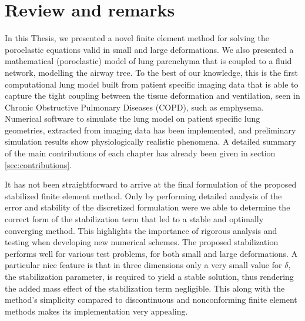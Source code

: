 

\section{Review and remarks}
In this Thesis, we presented a novel finite element method for solving the poroelastic equations valid in small and large deformations. We also presented a mathematical (poroelastic) model of lung parenchyma that is coupled to a fluid network, modelling the airway tree. 
To the best of our knowledge, this is the first computational lung model built from patient specific imaging data that is able to capture the tight coupling between the tissue deformation and ventilation, seen in Chronic Obstructive Pulmonary Diseases (COPD), such as emphysema. Numerical software to simulate the lung model on patient specific lung geometries, extracted from imaging data has been implemented, and preliminary simulation results show physiologically realistic phenomena. A detailed summary of the main contributions of each chapter has already been given in section \ref{sec:contributions}.



It has not been straightforward to arrive at the final formulation of the proposed stabilized finite element method. Only by performing detailed analysis of the error and stability of the discretized formulation were we able to determine the correct form of the stabilization term that led to a stable and optimally converging method. This highlights the importance of rigorous analysis and testing when developing new numerical schemes. The proposed stabilization performs well for various test problems, for both small and large deformations. A particular nice feature is that in three dimensions only a very small value for $\delta$, the stabilization parameter, is required to yield a stable solution, thus rendering the added mass effect of the stabilization term negligible. This along with the method's simplicity compared to discontinuous and nonconforming finite element methods makes its implementation very appealing.

